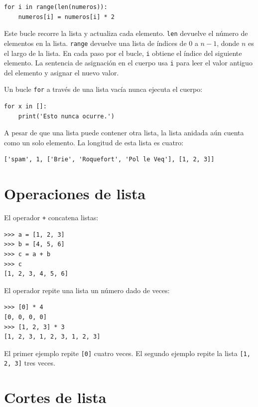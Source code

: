 \documentclass[10pt]{book}
\begin{document}
\begin{verbatim}
for i in range(len(numeros)):
    numeros[i] = numeros[i] * 2
\end{verbatim}
%
Este bucle recorre la lista y actualiza cada elemento.  {\tt len}
devuelve el número de elementos en la lista.  {\tt range} devuelve
una lista de índices de 0 a $n-1$, donde $n$ es el largo de
la lista.  En cada paso por el bucle, {\tt i} obtiene el índice
del siguiente elemento.  La sentencia de asignación en el cuerpo usa
{\tt i} para leer el valor antiguo del elemento y asignar el
nuevo valor.

Un bucle {\tt for} a través de una lista vacía nunca ejecuta el cuerpo:

\begin{verbatim}
for x in []:
    print('Esto nunca ocurre.')
\end{verbatim}
%
A pesar de que una lista puede contener otra lista, la lista
anidada aún cuenta como un solo elemento.  La longitud de esta lista es
cuatro:

\begin{verbatim}
['spam', 1, ['Brie', 'Roquefort', 'Pol le Veq'], [1, 2, 3]]
\end{verbatim}



\section{Operaciones de lista}

El operador {\tt +} concatena listas:

\begin{verbatim}
>>> a = [1, 2, 3]
>>> b = [4, 5, 6]
>>> c = a + b
>>> c
[1, 2, 3, 4, 5, 6]
\end{verbatim}
%
El operador {\tt *} repite una lista un número dado de veces:

\begin{verbatim}
>>> [0] * 4
[0, 0, 0, 0]
>>> [1, 2, 3] * 3
[1, 2, 3, 1, 2, 3, 1, 2, 3]
\end{verbatim}
%
El primer ejemplo repite {\tt [0]} cuatro veces.  El segundo ejemplo
repite la lista {\tt [1, 2, 3]} tres veces.


\section{Cortes de lista}
\end{document}
